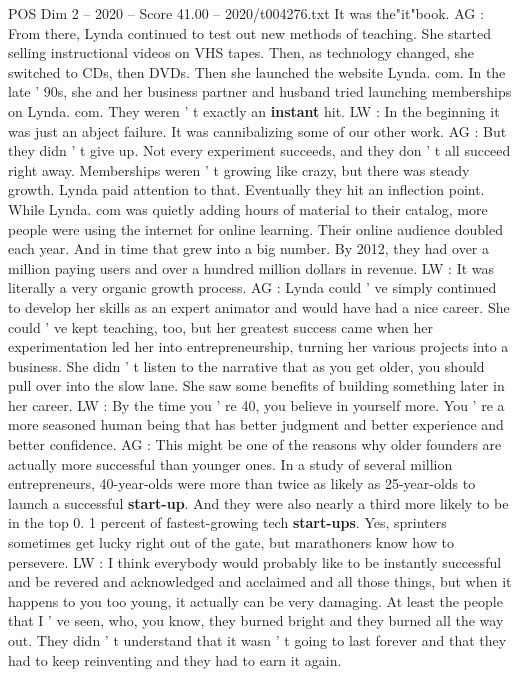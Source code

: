 \begin{textsample}{POS Dim 2 – 2020 – Score 41.00 – 2020/t004276.txt}
It was the"it"book.
AG : From there, Lynda continued to test out new methods of teaching.
She started selling instructional videos on VHS tapes.
Then, as technology changed, she switched to CDs, then DVDs.
Then she launched the website Lynda. com.
In the late ' 90s, she and her business partner and husband tried launching memberships on Lynda. com.
They weren ' t exactly an \textbf{instant} hit.
LW : In the beginning it was just an abject failure.
It was cannibalizing some of our other work.
AG : But they didn ' t give up.
Not every experiment succeeds, and they don ' t all succeed right away.
Memberships weren ' t growing like crazy, but there was steady growth.
Lynda paid attention to that.
Eventually they hit an inflection point.
While Lynda. com was quietly adding hours of material to their catalog, more people were using the internet for online learning.
Their online audience doubled each year.
And in time that grew into a big number.
By 2012, they had over a million paying users and over a hundred million dollars in revenue.
LW : It was literally a very organic growth process.
AG : Lynda could ' ve simply continued to develop her skills as an expert animator and would have had a nice career.
She could ' ve kept teaching, too, but her greatest success came when her experimentation led her into entrepreneurship, turning her various projects into a business.
She didn ' t listen to the narrative that as you get older, you should pull over into the slow lane.
She saw some benefits of building something later in her career.
LW : By the time you ' re 40, you believe in yourself more.
You ' re a more seasoned human being that has better judgment and better experience and better confidence.
AG : This might be one of the reasons why older founders are actually more successful than younger ones.
In a study of several million entrepreneurs, 40-year-olds were more than twice as likely as 25-year-olds to launch a successful \textbf{start-up}.
And they were also nearly a third more likely to be in the top 0. 1 percent of fastest-growing tech \textbf{start-ups}.
Yes, sprinters sometimes get lucky right out of the gate, but marathoners know how to persevere.
LW : I think everybody would probably like to be instantly successful and be revered and acknowledged and acclaimed and all those things, but when it happens to you too young, it actually can be very damaging.
At least the people that I ' ve seen, who, you know, they burned bright and they burned all the way out.
They didn ' t understand that it wasn ' t going to last forever and that they had to keep reinventing and they had to earn it again.

\end{textsample}
